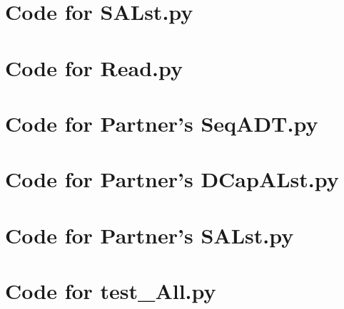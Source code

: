 \documentclass[12pt]{article}
\begin{document}
\newpage

\section{Code for SALst.py}

\noindent 

\newpage

\section{Code for Read.py}

\noindent 

\newpage

\section{Code for Partner's SeqADT.py}

\noindent 

\newpage

\section{Code for Partner's DCapALst.py}

\noindent 

\newpage

\section{Code for Partner's SALst.py}

\noindent 

\newpage

\section{Code for test\_All.py}

\noindent 
\end{document}

